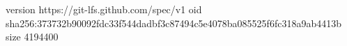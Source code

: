 version https://git-lfs.github.com/spec/v1
oid sha256:373732b90092fdc33f544dadbf3c87494c5e4078ba085525f6fc318a9ab4413b
size 4194400
